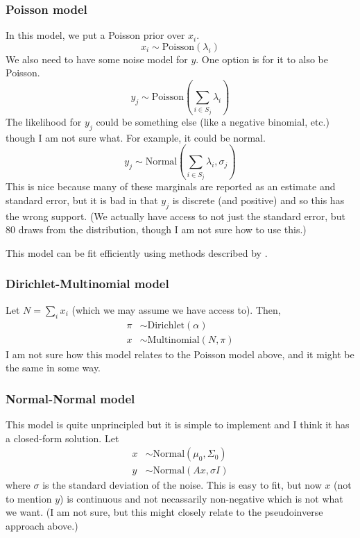 \documentclass[12pt]{article}
\begin{document}

\subsubsection{Poisson model}
In this model, we put a Poisson prior over $x_i$.
\begin{equation*}
    x_i \sim \mathrm{Poisson}(\lambda_i)
\end{equation*}
We also need to have some noise model for $y$. One option is for it to also be Poisson.
\begin{equation*}
    y_j \sim \mathrm{Poisson}\left(\sum_{i \in S_j} \lambda_i\right)
\end{equation*}
The likelihood for $y_j$ could be something else (like a negative binomial, etc.) though I am not sure what. For example, it could be normal.
\begin{equation*}
    y_j \sim \mathrm{Normal}\left(\sum_{i \in S_j} \lambda_i, \sigma_j\right)
\end{equation*}
This is nice because many of these marginals are reported as an estimate and standard error, but it is bad in that $y_j$ is discrete (and positive) and so this has the wrong support. (We actually have access to not just the standard error, but 80 draws from the distribution, though I am not sure how to use this.)

This model can be fit efficiently using methods described by \citet[Chapter~3, p.~23-31]{schein}.

\subsubsection{Dirichlet-Multinomial model}
Let $N = \sum_i x_i$ (which we may assume we have access to). Then,
\begin{align*}
    \pi &\sim \mathrm{Dirichlet}(\alpha) \\
    x &\sim \mathrm{Multinomial}(N, \pi)
\end{align*}
I am not sure how this model relates to the Poisson model above, and it might be the same in some way.

\subsubsection{Normal-Normal model}
This model is quite unprincipled but it is simple to implement and I think it has a closed-form solution. Let
\begin{align*}
    x &\sim \mathrm{Normal}(\mu_0, \Sigma_0) \\
    y &\sim \mathrm{Normal}(Ax, \sigma I)
\end{align*}
where $\sigma$ is the standard deviation of the noise. This is easy to fit, but now $x$ (not to mention $y$) is continuous and not necassarily non-negative which is not what we want. (I am not sure, but this might closely relate to the pseudoinverse approach above.)
\end{document}
